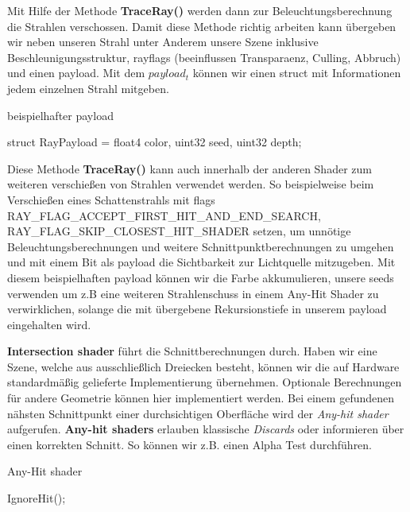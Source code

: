 Mit Hilfe der Methode \textbf{TraceRay()} werden dann zur Beleuchtungsberechnung 
die Strahlen verschossen. Damit diese Methode richtig arbeiten kann übergeben wir neben unseren Strahl 
unter Anderem  unsere Szene inklusive Beschleunigungsstruktur, rayflags 
(beeinflussen Transparaenz, Culling, Abbruch)\cite{RayFlags} und einen payload.
Mit dem \textit{$payload_t$} können wir einen struct mit Informationen jedem einzelnen Strahl mitgeben.

\begin{algorithm}[H]
    \caption{beispielhafter payload}
    \begin{algorithmic}[1]
        \State struct RayPayload = {float4 color, uint32 seed, uint32 depth};        
        \end{algorithmic}
        \label{alg:payload}
    \end{algorithm}
    
Diese Methode \textbf{TraceRay()} kann auch innerhalb der anderen Shader zum weiteren verschießen
von Strahlen verwendet werden. So beispielweise beim Verschießen eines Schattenstrahls mit flags 
RAY\_FLAG\_ACCEPT\_FIRST\_HIT\_AND\_END\_SEARCH, \newline
RAY\_FLAG\_SKIP\_CLOSEST\_HIT\_SHADER setzen, um unnötige 
Beleuchtungsberechnungen und weitere Schnittpunktberechnungen zu umgehen und mit einem Bit als payload 
die Sichtbarkeit zur Lichtquelle mitzugeben.
Mit diesem beispielhaften payload können wir die Farbe akkumulieren, unsere  
seeds verwenden um z.B eine weiteren Strahlenschuss in einem Any-Hit Shader zu verwirklichen,  
solange die mit übergebene Rekursionstiefe in unserem payload eingehalten wird.  

\textbf{Intersection shader} führt die Schnittberechnungen durch.
Haben wir eine Szene, welche aus ausschließlich Dreiecken besteht, können wir
die auf Hardware standardmäßig gelieferte Implementierung übernehmen. 
Optionale Berechnungen für andere Geometrie können hier implementiert werden.
Bei einem gefundenen nähsten Schnittpunkt einer durchsichtigen Oberfläche wird der 
\textit{Any-hit shader} aufgerufen.
\textbf{Any-hit shaders} erlauben klassische \textit{Discards} oder informieren
über einen korrekten Schnitt. So können wir z.B. einen Alpha Test durchführen.

\begin{algorithm}[H]
    \caption{Any-Hit shader}
    \begin{algorithmic}[1]
        \State IgnoreHit();
        \EndIf
    \end{algorithmic}
    \label{alg:any hit}
\end{algorithm}

